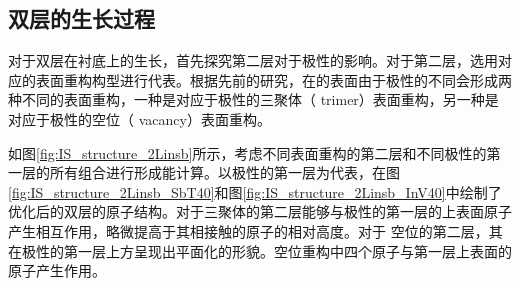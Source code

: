 \subsection{双层的生长过程}
\label{cap:IS_2L_growthProcess}
对于双层在衬底上的生长，首先探究第二层对于极性的影响。对于第二层，选用对应的表面重构构型进行代表。根据先前的研究，在的表面由于极性的不同会形成两种不同的表面重构，一种是对应于极性的三聚体（ trimer）表面重构，另一种是对应于极性的空位（ vacancy）表面重构。

如图\ref{fig:IS_structure_2Linsb}所示，考虑不同表面重构的第二层和不同极性的第一层的所有组合进行形成能计算。以极性的第一层为代表，在图\ref{fig:IS_structure_2Linsb_SbT40}和图\ref{fig:IS_structure_2Linsb_InV40}中绘制了优化后的双层的原子结构。对于三聚体的第二层能够与极性的第一层的上表面原子产生相互作用，略微提高于其相接触的原子的相对高度。对于 空位的第二层，其在极性的第一层上方呈现出平面化的形貌。空位重构中四个原子与第一层上表面的原子产生作用。


